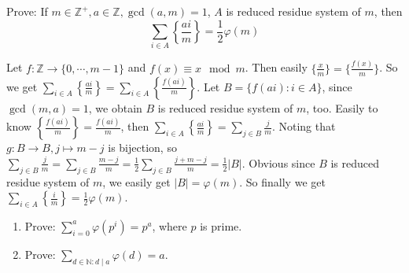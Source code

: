 \documentclass{ctexart}
\newif\ifpreface
\renewcommand{\phi}{\varphi}
\begin{document}
\large
\iffalse
  \setlength{\baselineskip}{1.2em}
  \ifpreface
    
  \else
    \maketitle
  \fi
\fi
{}
\begin{problem}\label{pro:p42.2}
  Prove: If \(m \in \mathbb{Z}^{+},a \in \mathbb{Z}, \gcd(a,m)=1\), \(A\) is reduced residue system of \(m\), then
  \[
    \sum_{i \in A}\left\{\frac{ai}{m}\right\} = \frac{1}{2} \phi(m)
  \]
\end{problem}
\begin{solution}
  Let \(f:\mathbb{Z} \to \{0,\cdots,m-1\}\) and \(f(x)\equiv x \mod m\).
  Then easily \(\{\frac{x}{m}\} = \{\frac{f(x)}{m}\}\).
  So we get \(\sum_{i \in A}\left\{\frac{ai}{m}\right\}=\sum_{i \in A}\left\{\frac{f(ai)}{m}\right\}\).
  Let \(B=\{f(ai):i \in A\}\), since \(\gcd(m,a)=1\), we obtain \(B\) is reduced residue system of \(m\), too.
  Easily to know \(\left\{\frac{f(ai)}{m}\right\}=\frac{f(ai)}{m}\),
  then \(\sum_{i \in A} \left\{\frac{ai}{m}\right\}=\sum_{j \in B}\frac{j}{m}\).
  Noting that \(g:B \to B,j \mapsto m-j\) is bijection, so
  \(\sum_{j \in B}\frac{j}{m}=\sum_{j \in B}\frac{m-j}{m}=\frac{1}{2}\sum_{j \in B}\frac{j + m-j}{m}=\frac{1}{2}|B|\).
  Obvious since \(B\) is reduced residue system of \(m\), we easily get \(|B|=\phi(m)\).
  So finally we get \(\sum_{i \in A}\left\{\frac{i}{m}\right\}=\frac{1}{2}\phi(m)\).
\end{solution}
\begin{problem}\label{pro:42.3}
  \begin{enumerate}
    \item Prove: \(\sum_{i=0}^{a}\phi(p^i)=p^a\), where \(p\) is prime.
    \item Prove: \(\sum_{d \in \mathbb{N}: d \mid a}\phi(d)=a\).
  \end{enumerate}
\end{problem}
\end{document}
